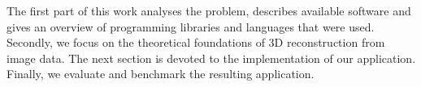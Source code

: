 The first part of this work analyses the problem, describes available software and gives an overview of programming libraries and languages that were used. 
Secondly, we focus on the theoretical foundations of 3D reconstruction from image data. %
The next section is devoted to the implementation of our application.
Finally, we evaluate and benchmark the resulting application. 


